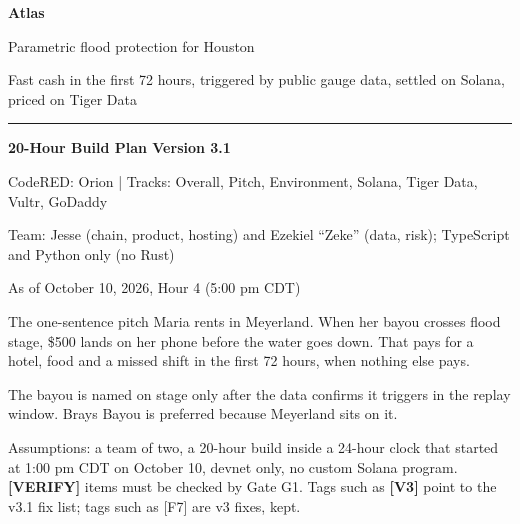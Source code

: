 \documentclass[11pt]{article}
\newcommand{\verify}{\textbf{[VERIFY]}}
\newcommand{\fix}[1]{\textcolor{fixgreen}{\textbf{[#1]}}}
\begin{document}
\begin{titlepage}
\thispagestyle{empty}
\vspace*{3.2cm}
{\fontsize{46}{50}\selectfont\bfseries\color{atlasblue} Atlas\par}
\vspace{0.4cm}
{\LARGE Parametric flood protection for Houston\par}
\vspace{0.5cm}
{\large Fast cash in the first 72 hours, triggered by public gauge data, settled on Solana, priced on Tiger Data\par}
\vspace{0.8cm}
{\color{atlasblue}\rule{\linewidth}{0.8pt}}
\vspace{0.8cm}

{\large\bfseries 20-Hour Build Plan \textemdash{} Version 3.1\par}
\vspace{0.3cm}
CodeRED: Orion \quad | \quad Tracks: Overall, Pitch, Environment, Solana, Tiger Data, Vultr, GoDaddy\par
Team: Jesse (chain, product, hosting) and Ezekiel ``Zeke'' (data, risk); TypeScript and Python only (no Rust)\par
As of October 10, 2026, Hour 4 (5:00 pm CDT)\par
\vspace{1cm}

\begin{callout}{The one-sentence pitch}
Maria rents in Meyerland. When her bayou crosses flood stage, \$500 lands on her phone before the water goes down. That pays for a hotel, food and a missed shift in the first 72 hours, when nothing else pays.
\end{callout}
{\small The bayou is named on stage only after the data confirms it triggers in the replay window. Brays Bayou is preferred because Meyerland sits on it.\par}

\vfill
{\small Assumptions: a team of two, a 20-hour build inside a 24-hour clock that started at 1:00 pm CDT on October 10, devnet only, no custom Solana program. \verify{} items must be checked by Gate G1. Tags such as \fix{V3} point to the v3.1 fix list; tags such as [F7] are v3 fixes, kept.\par}
\end{titlepage}

\tableofcontents
\newpage

\end{document}
